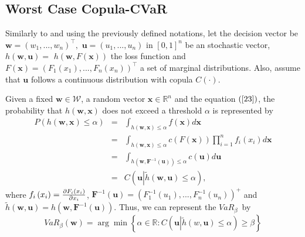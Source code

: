 \documentclass[a4paper,12pt]{report}
\begin{document}
\begin{refsection}
\vspace{0.6cm}

\subsection{Worst Case Copula-CVaR}

Similarly to \citet*{kakouris14} and using the previously defined notations,
let the decision vector be $\mathbf{w=}\left( w_{1},...,w_{n}\right) ^{\top
},$ $\mathbf{u}=\left( u_{1},...,u_{n}\right) $ in $[0,1]^{n}$ be an
stochastic vector, $h\left( \mathbf{w,u}\right) =$ $h\left( \mathbf{w,}%
F\left( \mathbf{x}\right) \right) $ the loss function and $F\left( \mathbf{x}%
\right) =\left( F_{1}\left( x_{1}\right) ,...,F_{n}\left( x_{n}\right)
\right) ^{\top }$ a set of marginal distributions. Also, assume that $\mathbf{u}$ follows a continuous
distribution with copula $C\left( \cdot \right) $.

\bigskip

Given a fixed $\mathbf{w\in }\mathcal{W}$, a random vector $\mathbf{x\in
	\mathbb{R}
}^{n}$ and the equation $\left( \ref{23}\right) $, the probability that $%
h\left( \mathbf{w,x}\right) $ does not exceed a threshold $\alpha $ is
represented by
\begin{eqnarray*}
	P\left( h\left( \mathbf{w,x}\right) \leq \alpha \right)  &=&\int_{h\left(
		\mathbf{w,x}\right) \leq \alpha }f\left( \mathbf{x}\right) d\mathbf{x} \\
	&=&\int_{h\left( \mathbf{w,x}\right) \leq \alpha }c\left( F\left( \mathbf{x}%
	\right) \right) \prod_{i=1}^{n}f_{i}\left( x_{i}\right) d\mathbf{x} \\
	&=&\int_{h\left( \mathbf{w,F}^{-1}\left( \mathbf{u}\right) \right) \leq
		\alpha }c\left( \mathbf{u}\right) d\mathbf{u} \\
	&=&C\left( \mathbf{u}\left\vert \widetilde{h}\left( \mathbf{w,u}\right) \leq
	\alpha \right. \right) ,
\end{eqnarray*}%
where $f_{i}\left( x_{i}\right) =\frac{\partial F_{i}\left( x_{i}\right) }{%
	\partial x_{i}}$, $\mathbf{F}^{-1}\left( \mathbf{u}\right) =\left(
F_{1}^{-1}\left( u_{1}\right) ,...,F_{n}^{-1}\left( u_{n}\right) \right) ^{+}
$ and $\widetilde{h}\left( \mathbf{w,u}\right) =h\left( \mathbf{w,F}%
^{-1}\left( \mathbf{u}\right) \right) .$ Thus, we can represent the $VaR_{\beta }$\thinspace\ by
\begin{equation}
VaR_{\beta }\left( \mathbf{w}\right) =\arg \min \left\{ \alpha \in
\mathbb{R}
:C\left( \mathbf{u}\left\vert \widetilde{h}\left( w\mathbf{,u}\right) \leq \alpha
\right. \right) \geq \beta \right\}  \label{25}
\end{equation}


\end{refsection}
\end{document}
